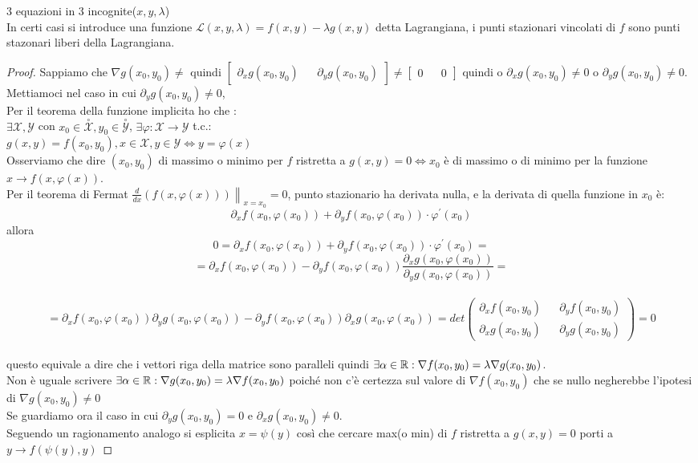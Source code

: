 3 equazioni in 3 incognite($x,y,\lambda$)\\
In certi casi si introduce una funzione $\mathcal{L}(x,y,\lambda) = f(x,y)-\lambda g(x,y)$ detta Lagrangiana, i punti stazionari vincolati di $f$ sono punti stazonari liberi della Lagrangiana.\\
\begin{proof}
	Sappiamo che $\nabla g(x_0,y_0)\ne$ quindi $\begin{bmatrix}\partial_xg(x_0,y_0) &&\partial_yg(x_0,y_0)\end{bmatrix}\ne\begin{bmatrix}0&&0\end{bmatrix}$ quindi o $\partial_xg(x_0,y_0)\ne 0$ o $\partial_yg(x_0,y_0)\ne 0$.
	Mettiamoci nel caso in cui $\partial_yg(x_0,y_0)\ne 0$,\\
    Per il teorema della funzione implicita ho che :\\
	$\exists\mathcal{X},\mathcal{Y}$ con $x_0\in\overset{\circ}{\mathcal{X}}, y_0\in\overset{\circ}{\mathcal{Y}}$, $\exists\varphi:\mathcal{X}\rightarrow\mathcal{Y}$ t.c.:\\
	$g(x,y)=f(x_0,y_0), x\in\mathcal{X}, y\in\mathcal{Y} \Leftrightarrow y=\varphi(x)$\\
	Osserviamo che dire $(x_0,y_0)$ di massimo o minimo per $f$ ristretta a $g(x,y)=0\Leftrightarrow x_0$ è di massimo o di minimo per la funzione $x\rightarrow f(x,\varphi(x))$.\\
	Per il teorema di Fermat $\left.\frac{d}{dx}(f(x,\varphi(x)))\right\|_{x=x_0}=0$, punto stazionario ha derivata nulla, e la derivata di quella funzione in $x_0$ è:
	$$\partial_xf(x_0,\varphi(x_0))+\partial_yf(x_0,\varphi(x_0))\cdot\varphi^{'}(x_0)$$ 
	allora
	$$0=\partial_xf(x_0,\varphi(x_0))+\partial_yf(x_0,\varphi(x_0))\cdot\varphi^{'}(x_0)=$$
	$$=\partial_xf(x_0,\varphi(x_0))-\partial_yf(x_0,\varphi(x_0))\frac{\partial_xg(x_0,\varphi(x_0))}{\partial_yg(x_0,\varphi(x_0))}=$$\\
	$$=\partial_xf(x_0,\varphi(x_0))\partial_yg(x_0,\varphi(x_0))-\partial_yf(x_0,\varphi(x_0))\partial_xg(x_0,\varphi(x_0))=det\left(\begin{matrix}\partial_xf(x_0,y_0)&&\partial_yf(x_0,y_0)\\\partial_xg(x_0,y_0)&&\partial_yg(x_0,y_0)\end{matrix}\right)=0$$\\
	questo equivale a dire che i vettori riga della matrice sono paralleli quindi $\exists\alpha\in \mathbb{R} : \nabla f(x_0,y_0)=\lambda\nabla g(x_0,y_0)$.\\
	Non è uguale scrivere $\exists\alpha\in \mathbb{R} : \nabla g(x_0,y_0)=\lambda\nabla f(x_0,y_0)$ poiché non c'è certezza sul valore di $\nabla f(x_0,y_0)$ che se nullo negherebbe l'ipotesi di $\nabla g(x_0,y_0)\ne 0$\\
	Se guardiamo ora il caso in cui $\partial_yg(x_0,y_0)=0$ e $\partial_xg(x_0,y_0)\ne 0$.\\
	Seguendo un ragionamento analogo si esplicita $x=\psi(y)$ così che cercare max(o min) di $f$ ristretta a $g(x,y)=0$ porti a $y\rightarrow f(\psi(y),y)$ 
\end{proof}
